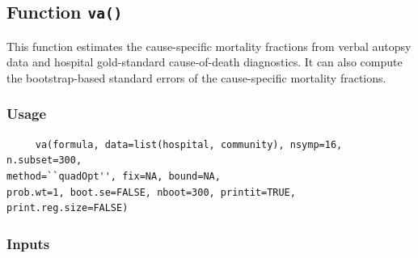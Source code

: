 \documentclass[oneside,letterpaper,titlepage]{article}
\begin{document}
\subsection{Function \texttt{va()}}

This function estimates the cause-specific mortality fractions from
verbal autopsy data and hospital gold-standard cause-of-death
diagnostics.  It can also compute the bootstrap-based standard errors
of the cause-specific mortality fractions.

\subsubsection{Usage}

\begin{verbatim}
     va(formula, data=list(hospital, community), nsymp=16, n.subset=300,
method=``quadOpt'', fix=NA, bound=NA, 
prob.wt=1, boot.se=FALSE, nboot=300, printit=TRUE, print.reg.size=FALSE)
\end{verbatim}

\subsubsection{Inputs}
\end{document}
